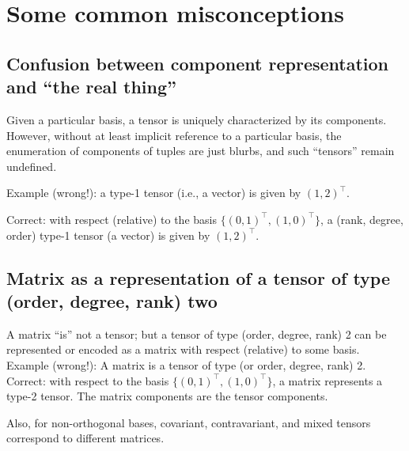 \section{Some common misconceptions}

\subsection{Confusion between component representation and ``the real thing''}

Given a particular basis, a tensor is uniquely characterized by its components.
However, without at least implicit reference to a particular basis, the enumeration of components of tuples are just blurbs,
and such ``tensors'' remain undefined.

{
\color{blue}
\bexample
Example (wrong!): a type-1 tensor (i.e., a vector) is given by
$(1,2)^\intercal $.

Correct: with respect (relative) to the basis $\{(0,1)^\intercal,(1,0)^\intercal\}$,  a (rank, degree, order) type-1 tensor (a vector) is given by
$(1,2)^\intercal$.
\eexample
}


\subsection{Matrix as a representation of a tensor of type (order, degree, rank) two}

A matrix ``is'' not a tensor; but a tensor of  type (order, degree, rank) 2 can be represented or encoded as a matrix
 with respect (relative) to some basis.
{
\color{blue}
\bexample
Example (wrong!): A matrix is  a  tensor of type (or order, degree, rank) 2.
Correct: with respect to the basis $\{(0,1)^\intercal,(1,0)^\intercal\}$,  a matrix represents a type-2 tensor.
The matrix components are the tensor components.
\eexample
}


Also, for non-orthogonal bases, covariant, contravariant, and mixed tensors correspond to different matrices.


\begin{center}
{\color{olive}   \Huge
\floweroneright
}
\end{center}



